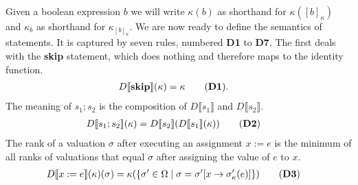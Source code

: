 \documentclass{llncs}
\newcommand{\mods}[2]{[#2]_{#1}}
\newcommand{\dn}[1]{D\llbracket #1 \rrbracket}
\newcommand{\States}{\Omega}
\begin{document}
Given a boolean expression $b$ we will write $\kappa(b)$ as shorthand for $\kappa(\mods{\kappa}{b})$ and $\kappa_{b}$ as shorthand for $\kappa_{\mods{\kappa}{b}}$.
We are now ready to define the semantics of statements. 
It is captured by seven rules, numbered \textbf{D1} to \textbf{D7}.
The first deals with the \textbf{skip} statement, which does nothing and therefore maps to the identity function.
\begin{align}
\dn{\textbf{skip}}(\kappa) 		& = \kappa \tag{\textbf{D1}}. 
\end{align}
The meaning of $s_1; s_2$ is the composition of $\dn{s_1}$ and $\dn{s_2}$.
\begin{align}
\dn{s_1 ; s_2}(\kappa) 		& = \dn{s_2}(\dn{s_1}(\kappa))\tag{\textbf{D2}} 
\end{align}
The rank of a valuation $\sigma$ after executing an assignment $x := e$ 
	is the minimum of all ranks of valuations that equal $\sigma$ after assigning the value of $e$ to $x$.
\begin{align}
\dn{x := e}(\kappa)(\sigma) 	& = \kappa( \{ \sigma' \in \States \mid \sigma = \sigma'[x \rightarrow \sigma'_\kappa(e)] \})\tag{\textbf{D3}} 
\end{align}
\end{document}
